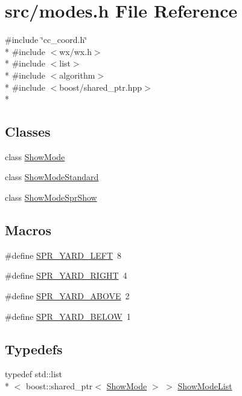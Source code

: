 \hypertarget{a00236}{\section{src/modes.h File Reference}
\label{a00236}
}
{\ttfamily \#include \char`\"{}cc\-\_\-coord.\-h\char`\"{}}\\*
{\ttfamily \#include $<$wx/wx.\-h$>$}\\*
{\ttfamily \#include $<$list$>$}\\*
{\ttfamily \#include $<$algorithm$>$}\\*
{\ttfamily \#include $<$boost/shared\-\_\-ptr.\-hpp$>$}\\*
\subsection*{Classes}
\begin{DoxyCompactItemize}
\item 
class \hyperlink{a00140}{Show\-Mode}
\item 
class \hyperlink{a00143}{Show\-Mode\-Standard}
\item 
class \hyperlink{a00142}{Show\-Mode\-Spr\-Show}
\end{DoxyCompactItemize}
\subsection*{Macros}
\begin{DoxyCompactItemize}
\item 
\#define \hyperlink{a00236_a6b0901343c2eaff1df4a95fc4dd2cae9}{S\-P\-R\-\_\-\-Y\-A\-R\-D\-\_\-\-L\-E\-F\-T}~8
\item 
\#define \hyperlink{a00236_a84f909ae80693a1a903c873821eae689}{S\-P\-R\-\_\-\-Y\-A\-R\-D\-\_\-\-R\-I\-G\-H\-T}~4
\item 
\#define \hyperlink{a00236_a57db2273220cd4bde69fcafb32a03726}{S\-P\-R\-\_\-\-Y\-A\-R\-D\-\_\-\-A\-B\-O\-V\-E}~2
\item 
\#define \hyperlink{a00236_a3f125f7e7a83ca8c9d363185c713578a}{S\-P\-R\-\_\-\-Y\-A\-R\-D\-\_\-\-B\-E\-L\-O\-W}~1
\end{DoxyCompactItemize}
\subsection*{Typedefs}
\begin{DoxyCompactItemize}
\item 
typedef std\-::list\\*
$<$ boost\-::shared\-\_\-ptr$<$ \hyperlink{a00140}{Show\-Mode} $>$ $>$ \hyperlink{a00236_a39f2aa1ac0d2da59ef7f3e58b13f44d2}{Show\-Mode\-List}
\end{DoxyCompactItemize}
